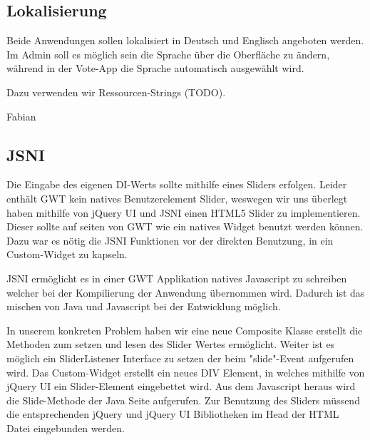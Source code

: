 \subsection{Lokalisierung}
Beide Anwendungen sollen lokalisiert in Deutsch und Englisch angeboten werden.
Im Admin soll es möglich sein die Sprache über die Oberfläche zu ändern, während
in der Vote-App die Sprache automatisch ausgewählt wird.

Dazu verwenden wir Ressourcen-Strings (TODO).

Fabian

\subsection{JSNI}
Die Eingabe des eigenen DI-Werts sollte mithilfe eines Sliders erfolgen. Leider enthält GWT kein natives Benutzerelement Slider, weswegen wir uns überlegt haben mithilfe von jQuery UI und JSNI einen HTML5 Slider zu implementieren. Dieser sollte auf seiten von GWT wie ein natives Widget benutzt werden können. Dazu war es nötig die JSNI Funktionen vor der direkten Benutzung, in ein Custom-Widget zu kapseln. 

JSNI ermöglicht es in einer GWT Applikation natives Javascript zu schreiben welcher bei der Kompilierung der Anwendung übernommen wird. 
Dadurch ist das mischen von Java und Javascript bei der Entwicklung möglich.

In unserem konkreten Problem haben wir eine neue Composite Klasse erstellt die Methoden zum setzen und lesen des Slider Wertes ermöglicht. Weiter ist es möglich ein SliderListener Interface zu setzen der beim "slide"-Event aufgerufen wird. Das Custom-Widget erstellt ein neues DIV Element, in welches mithilfe von jQuery UI ein Slider-Element eingebettet wird. Aus dem Javascript heraus wird die Slide-Methode der Java Seite aufgerufen. Zur Benutzung des Sliders müssend die entsprechenden jQuery und jQuery UI Bibliotheken im Head der HTML Datei eingebunden werden.

